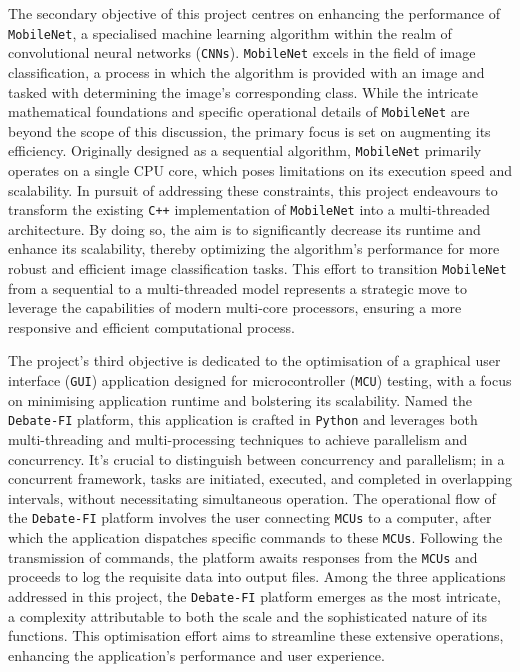 \documentclass[12pt]{article}
\begin{document}
The secondary objective of this project centres on enhancing the performance of \texttt{MobileNet}, a specialised machine learning algorithm within the realm of convolutional neural networks (\texttt{CNNs}). \texttt{MobileNet} excels in the field of image classification, a process in which the algorithm is provided with an image and tasked with determining the image's corresponding class. While the intricate mathematical foundations and specific operational details of \texttt{MobileNet} are beyond the scope of this discussion, the primary focus is set on augmenting its efficiency. Originally designed as a sequential algorithm, \texttt{MobileNet} primarily operates on a single CPU core, which poses limitations on its execution speed and scalability. In pursuit of addressing these constraints, this project endeavours to transform the existing \texttt{C++} implementation of \texttt{MobileNet} into a multi-threaded architecture. By doing so, the aim is to significantly decrease its runtime and enhance its scalability, thereby optimizing the algorithm's performance for more robust and efficient image classification tasks. This effort to transition \texttt{MobileNet} from a sequential to a multi-threaded model represents a strategic move to leverage the capabilities of modern multi-core processors, ensuring a more responsive and efficient computational process.

The project's third objective is dedicated to the optimisation of a graphical user interface (\texttt{GUI}) application designed for microcontroller (\texttt{MCU}) testing, with a focus on minimising application runtime and bolstering its scalability. Named the \texttt{Debate-FI} platform, this application is crafted in \texttt{Python} and leverages both multi-threading and multi-processing techniques to achieve parallelism and concurrency. It's crucial to distinguish between concurrency and parallelism; in a concurrent framework, tasks are initiated, executed, and completed in overlapping intervals, without necessitating simultaneous operation. The operational flow of the \texttt{Debate-FI} platform involves the user connecting \texttt{MCUs} to a computer, after which the application dispatches specific commands to these \texttt{MCUs}. Following the transmission of commands, the platform awaits responses from the \texttt{MCUs} and proceeds to log the requisite data into output files. Among the three applications addressed in this project, the \texttt{Debate-FI} platform emerges as the most intricate, a complexity attributable to both the scale and the sophisticated nature of its functions. This optimisation effort aims to streamline these extensive operations, enhancing the application's performance and user experience.
\end{document}
